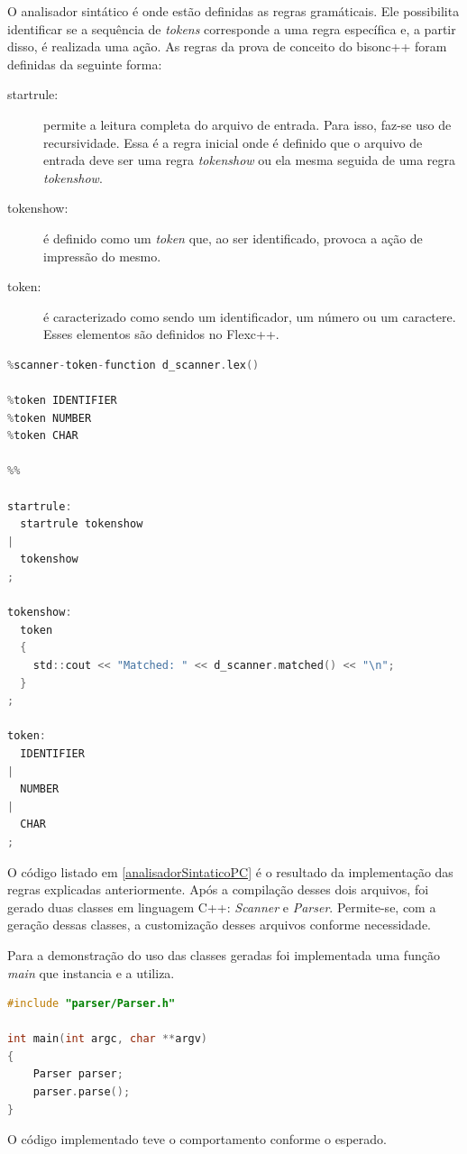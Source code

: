\par 
\indent O analisador sintático é onde estão definidas as regras gramáticais. Ele possibilita identificar se a sequência de \textit{tokens} corresponde a uma regra específica e, a partir disso, é realizada uma ação. As regras da prova de conceito do bisonc++ foram definidas da seguinte forma:
\begin{description}
\item[startrule:] permite a leitura completa do arquivo de entrada. Para isso, faz-se uso de recursividade. Essa é a regra inicial onde é definido que o arquivo de entrada deve ser uma regra \textit{tokenshow} ou ela mesma seguida de uma regra \textit{tokenshow}.
\item[tokenshow:] é definido como um \textit{token} que, ao ser identificado, provoca a ação de impressão do mesmo.
\item[token:] é caracterizado como sendo um identificador, um número ou um caractere. Esses elementos são definidos no Flexc++.
\end{description} 

\begin{lstlisting}[language=c, label=analisadorSintaticoPC, caption=Analisador Sintático da Prova de Conceito do Bisonc++]
%scanner                ../scanner/Scanner.h
%scanner-token-function d_scanner.lex()

%token IDENTIFIER
%token NUMBER
%token CHAR

%%

startrule:
  startrule tokenshow
|
  tokenshow
;

tokenshow:
  token
  {
    std::cout << "Matched: " << d_scanner.matched() << "\n";
  }
;

token:
  IDENTIFIER
|
  NUMBER
|
  CHAR
;
\end{lstlisting}
\par
\indent O código listado em \ref{analisadorSintaticoPC} é o resultado da implementação das regras explicadas anteriormente. Após a compilação desses dois arquivos, foi gerado duas classes em linguagem C++: \textit{Scanner} e \textit{Parser}. Permite-se, com a geração dessas classes, a customização desses arquivos conforme necessidade.
\par
\indent Para a demonstração do uso das classes geradas foi implementada uma função \textit{main} que instancia e a utiliza.
\begin{lstlisting}[language=c, label=mainPCB, caption=Função \textit{main} para demosntração do Bisonc++]
#include "parser/Parser.h"

int main(int argc, char **argv)
{
    Parser parser;
    parser.parse();
}
\end{lstlisting}
\par
\indent O código implementado teve o comportamento conforme o esperado.

